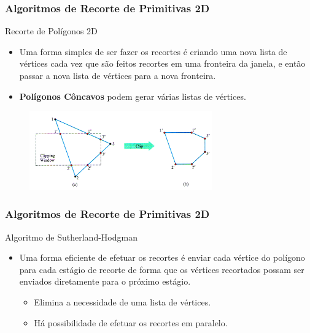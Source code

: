 \documentclass{beamer}
\begin{document}
\begin{frame}
\frametitle{Algoritmos de Recorte de Primitivas 2D}

	\begin{block}{Recorte de Polígonos 2D}
		\begin{itemize}
			\item Uma forma simples de ser fazer os recortes é criando uma nova lista de vértices cada vez que são feitos recortes em uma fronteira da janela, e então passar a nova lista de vértices para a nova fronteira.
			\item \textbf{Polígonos Côncavos} podem gerar várias listas de vértices.
		\end{itemize}
	\end{block}
	
	\begin{figure}[!h]
			\begin{center}
				\includegraphics[width=0.7\textwidth]{Figures/RecPolCon}
			\end{center}
	\end{figure}
\end{frame}

\begin{frame}
\frametitle{Algoritmos de Recorte de Primitivas 2D}

	\begin{block}{Algoritmo de Sutherland-Hodgman}
		\begin{itemize}
			\item Uma forma eficiente de efetuar os recortes é enviar cada vértice do polígono para cada estágio de recorte de forma que os vértices recortados possam ser enviados diretamente para o próximo estágio.
			\begin{itemize}
				\item Elimina a necessidade de uma lista de vértices.
				\item Há possibilidade de efetuar os recortes em paralelo.
			\end{itemize}
		\end{itemize}
	\end{block}
\end{frame}
\end{document}
